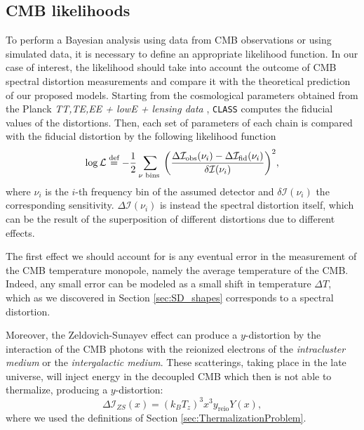 \subsection{CMB likelihoods}
To perform a Bayesian analysis using data from CMB observations or using simulated data, it is necessary to define an appropriate likelihood function. In our case of interest, the likelihood should take into account the outcome of CMB spectral distortion measurements and compare it with the theoretical prediction of our proposed models. Starting from the cosmological parameters obtained from the Planck \emph{TT,TE,EE + lowE + lensing data} \cite{planck2018results}, \texttt{CLASS} computes the fiducial values of the distortions. Then, each set of parameters of each chain is compared with the fiducial distortion by the following likelihood function
\begin{equation}
    \log \mathcal L\stackrel{\text{def}}{=} -\frac12 \sum_{\nu \text{ bins }}\bigg(\frac{\Delta\mathcal I_\text{obs}(\nu_i)-\Delta\mathcal I_\text{fid}(\nu_i)}{\delta \mathcal I(\nu_i)}\bigg)^2,
\end{equation}
where $\nu_i$ is the $i$-th frequency bin of the assumed detector and $\delta \mathcal I(\nu_i)$ the corresponding sensitivity. $\Delta \mathcal I(\nu_i)$ is instead the spectral distortion itself, which can be the result of the superposition of different distortions due to different effects. 

The first effect we should account for is any eventual error in the measurement of the CMB temperature monopole, namely the average temperature of the CMB. Indeed, any small error can be modeled as a small shift in temperature $\Delta T$, which as we discovered in Section \ref{sec:SD_shapes} corresponds to a spectral distortion.

Moreover, the Zeldovich-Sunayev effect \cite{Zeldovich1972} can produce a $y$-distortion by the interaction of the CMB photons with the reionized electrons of the \emph{intracluster medium} or the \emph{intergalactic medium}. These scatterings, taking place in the late universe, will inject energy in the decoupled CMB which then is not able to thermalize, producing a $y$-distortion:
$$ \Delta \mathcal I_{ZS}(x)=(k_BT_z)^3x^3 y_\text{reio} Y(x),$$
where we used the definitions of Section \ref{sec:ThermalizationProblem}.

